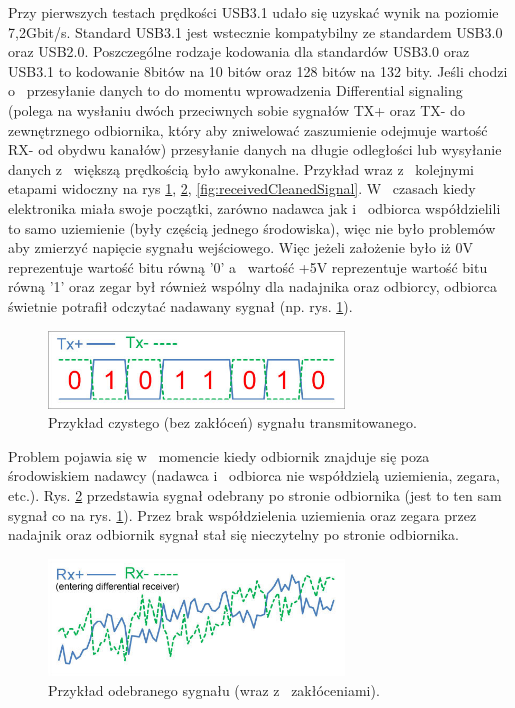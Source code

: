 \documentclass{BscUS}
\begin{document}
Przy pierwszych testach prędkości USB3.1 udało się uzyskać wynik na poziomie 7,2Gbit/s. Standard USB3.1 jest wstecznie kompatybilny ze standardem USB3.0 oraz USB2.0.
\cite{USB30Doc}
\newline
\indent Poszczególne rodzaje kodowania dla standardów USB3.0 oraz USB3.1 to kodowanie 8bitów na 10 bitów oraz 128 bitów na 132 bity. 
Jeśli chodzi o~ przesyłanie danych to do momentu wprowadzenia Differential signaling (polega na wysłaniu dwóch przeciwnych sobie sygnałów TX+ oraz TX- do zewnętrznego odbiornika, który aby zniwelować zaszumienie odejmuje wartość RX- od obydwu kanałów) przesyłanie danych na długie odległości lub wysyłanie danych z~ większą prędkością było awykonalne. Przykład wraz z~ kolejnymi etapami widoczny na rys \ref{fig:cleanSignal}, \ref{fig:receivedNoiseSignal}, \ref{fig:receivedCleanedSignal}.
\newline
\indent W~ czasach kiedy elektronika miała swoje początki, zarówno nadawca jak i~ odbiorca współdzielili to samo uziemienie (były częścią jednego środowiska), więc nie było problemów aby zmierzyć napięcie sygnału wejściowego. Więc jeżeli założenie było iż 0V reprezentuje wartość bitu równą '0' a~ wartość +5V reprezentuje wartość bitu równą '1' oraz zegar był również wspólny dla nadajnika oraz odbiorcy, odbiorca świetnie potrafił odczytać nadawany sygnał (np. rys. \ref{fig:cleanSignal}).
\begin{figure}[H]
\centering
\includegraphics[width=0.7\textwidth]{./img/cleanSignal}
\caption{Przykład czystego (bez zakłóceń) sygnału transmitowanego. \cite{cleanSignal}}
\label{fig:cleanSignal}
\end{figure}
\noindent Problem pojawia się w~ momencie kiedy odbiornik znajduje się poza środowiskiem nadawcy (nadawca i~ odbiorca nie współdzielą uziemienia, zegara, etc.). Rys. \ref{fig:receivedNoiseSignal} przedstawia sygnał odebrany po stronie odbiornika (jest to ten sam sygnał co na rys. \ref{fig:cleanSignal}). Przez brak współdzielenia uziemienia oraz zegara przez nadajnik oraz odbiornik sygnał stał się nieczytelny po stronie odbiornika.
\begin{figure}[H]
\centering
\includegraphics[width=0.7\textwidth]{./img/receivedNoiseSignal}
\caption{Przykład odebranego sygnału (wraz z~ zakłóceniami). \cite{receivedNoiseSignal}}

\label{fig:receivedNoiseSignal}
\end{figure}
\end{document}
